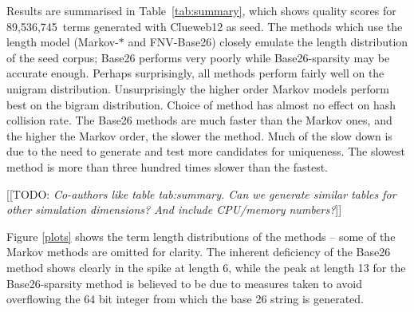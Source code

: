 \documentclass[11pt]{report}
\newcommand{\todo}[1]{{\color{blue}[[TODO: {\emph{#1}}]]}}
\begin{document}
Results are summarised in Table~\ref{tab:summary}, which shows quality
scores for 89,536,745~terms generated with Clueweb12 as seed.  The
methods which use the length model (Markov-$*$ and FNV-Base26) closely
emulate
the length distribution of the seed corpus;  Base26 performs very
poorly while Base26-sparsity may be accurate enough. Perhaps
surprisingly, all methods
perform fairly well on the unigram distribution.  Unsurprisingly the
higher order Markov models perform best on the bigram distribution.
Choice of method has almost no effect on hash collision rate.  The
Base26 methods are much faster than the Markov ones, and the higher
the Markov order, the slower the method.  Much of the slow down is due
to the need to generate and test more candidates for uniqueness.  The
slowest method is more than three hundred times slower than the fastest.

\todo{Co-authors like table tab:summary. Can we generate similar
  tables for other simulation dimensions?  And include CPU/memory numbers?}

Figure \ref{plots} shows the term length distributions of the methods
-- some of the Markov methods are omitted for clarity.  The inherent deficiency
of the Base26 method shows clearly in the spike at length 6, while the
peak at length 13 for the Base26-sparsity method is believed to be due
to measures taken to avoid overflowing the 64 bit integer from
which the base 26 string is generated.
\end{document}
